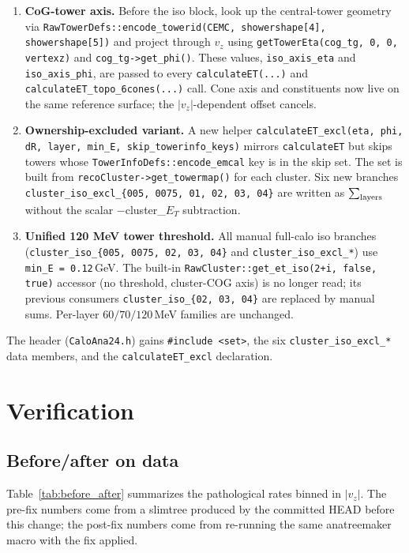 \documentclass[11pt,a4paper]{article}
\newcommand{\fix}[1]{\textcolor[rgb]{0,0.5,0}{\textbf{#1}}}
\newcommand{\branch}[1]{\texttt{\small #1}}
\begin{document}
\begin{enumerate}
  \item \fix{CoG-tower axis.} Before the iso block, look up the central-tower
    geometry via
    \verb|RawTowerDefs::encode_towerid(CEMC, showershape[4], showershape[5])|
    and project through $v_z$ using \verb|getTowerEta(cog_tg, 0, 0, vertexz)|
    and \verb|cog_tg->get_phi()|. These values, \verb|iso_axis_eta| and
    \verb|iso_axis_phi|, are passed to every \verb|calculateET(...)| and
    \verb|calculateET_topo_6cones(...)| call. Cone axis and constituents now
    live on the same reference surface; the $|v_z|$-dependent offset cancels.
  \item \fix{Ownership-excluded variant.} A new helper
    \verb|calculateET_excl(eta, phi, dR, layer, min_E, skip_towerinfo_keys)|
    mirrors \verb|calculateET| but skips towers whose
    \verb|TowerInfoDefs::encode_emcal| key is in the skip set. The set is
    built from \verb|recoCluster->get_towermap()| for each cluster. Six new
    branches \branch{cluster\_iso\_excl\_\{005, 0075, 01, 02, 03, 04\}} are
    written as \(\sum_{\rm layers}\) without the scalar
    $-$cluster\_$E_T$ subtraction.
  \item \fix{Unified 120 MeV tower threshold.} All manual full-calo iso
    branches (\branch{cluster\_iso\_\{005, 0075, 02, 03, 04\}} and
    \branch{cluster\_iso\_excl\_*}) use \verb|min_E = 0.12|\,GeV. The built-in
    \verb|RawCluster::get_et_iso(2+i, false, true)| accessor (no threshold,
    cluster-COG axis) is no longer read; its previous consumers
    \branch{cluster\_iso\_\{02, 03, 04\}} are replaced by manual sums.
    Per-layer $60 / 70 / 120$\,MeV families are unchanged.
\end{enumerate}

The header (\branch{CaloAna24.h}) gains \verb|#include <set>|, the six
\verb|cluster_iso_excl_*| data members, and the \verb|calculateET_excl|
declaration.

\section{Verification}

\subsection{Before/after on data}

Table~\ref{tab:before_after} summarizes the pathological rates binned in
$|v_z|$. The pre-fix numbers come from a slimtree produced by the committed
HEAD before this change; the post-fix numbers come from re-running the same
anatreemaker macro with the fix applied.
\end{document}
